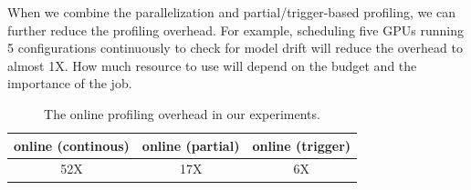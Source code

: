 When we combine the parallelization and partial/trigger-based profiling, we can
further reduce the profiling overhead. For example, scheduling five GPUs running
5 configurations continuously to check for model drift will reduce the overhead
to almost 1X. How much resource to use will depend on the budget and the
importance of the job.


\begin{table}[t]
  \centering
  \begin{tabular}{c c c}
    \toprule
    online (continous) & online (partial) & online (trigger) \\
    \midrule
    52X   & 17X              & 6X \\
    \bottomrule
  \end{tabular}
  \caption{The online profiling overhead in our experiments.}
  \label{tab:online}
\end{table}

